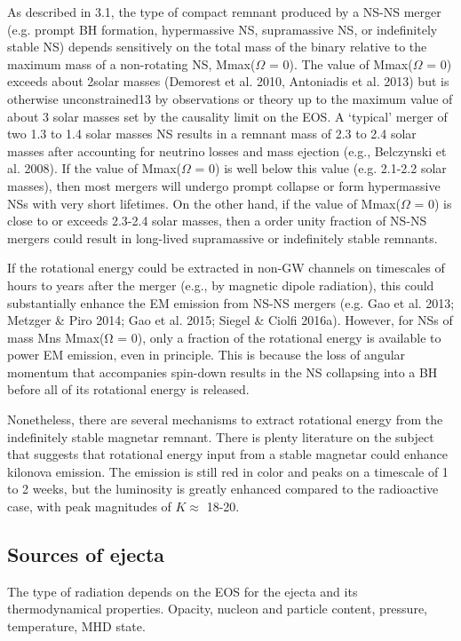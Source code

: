 As described in 3.1, the type of compact remnant produced by a NS-NS merger (e.g. prompt BH formation, hypermassive NS, supramassive NS, or indefinitely stable NS) depends sensitively on the total mass of the binary relative to the maximum mass of a non-rotating NS, Mmax($\Omega$ = 0). The value of Mmax($\Omega$ = 0) exceeds about 2solar masses (Demorest et al. 2010, Antoniadis et al. 2013) but is otherwise unconstrained13 by observations or theory up to the maximum value of about 3 solar masses set by the causality limit on the EOS. A `typical' merger of two 1.3 to 1.4 solar masses NS results in a remnant mass of 2.3 to 2.4 solar masses after accounting for neutrino losses and mass ejection (e.g., Belczynski et al. 2008). If the value of Mmax($\Omega$ = 0) is well below this value (e.g. 2.1-2.2 solar masses), then most mergers will undergo prompt collapse or form hypermassive NSs with very short lifetimes. On the other hand, if the value of Mmax($\Omega$ = 0) is close to or exceeds 2.3-2.4 solar masses, then a order unity fraction of NS-NS mergers could result in long-lived supramassive or indefinitely stable remnants.

If the rotational energy could be extracted in non-GW channels on timescales of hours to years after the merger (e.g., by magnetic dipole radiation), this could substantially enhance the EM emission from NS-NS mergers (e.g. Gao et al. 2013; Metzger \& Piro 2014; Gao et al. 2015; Siegel \& Ciolfi 2016a). However, for NSs of mass Mns   Mmax(Ω = 0), only a fraction of the rotational energy is available to power EM emission, even in principle. This is because the loss of angular momentum that accompanies spin-down results in the NS collapsing into a BH before all of its rotational energy is released.

Nonetheless, there are several mechanisms to extract rotational energy from the indefinitely stable magnetar remnant.
There is plenty literature on the subject that suggests that rotational energy input from a stable magnetar could enhance kilonova emission. The emission is still red in color and peaks on a timescale of 1 to 2 weeks, but the luminosity is greatly enhanced compared to the radioactive case, with peak magnitudes of $K \approx$ 18-20.

\subsection{Sources of ejecta}

The type of radiation depends on the EOS for the ejecta and its thermodynamical properties. Opacity, nucleon and particle content, pressure, temperature, MHD state.

